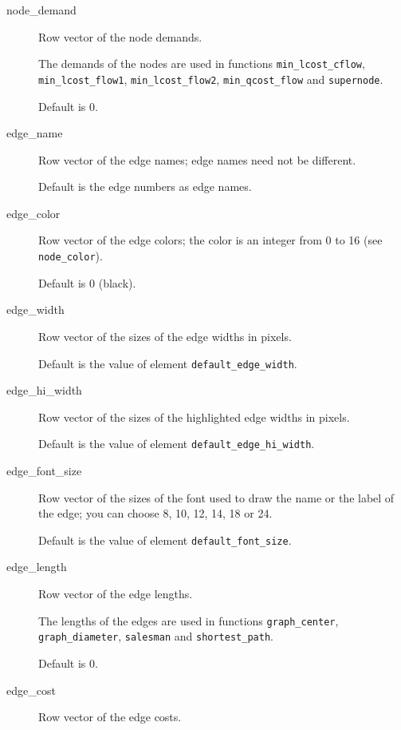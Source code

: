 \documentclass[11pt]{article}
\newcommand{\func}[1]{\texttt{#1}}
\begin{document}
\begin{description}
  \item[node\_demand]

Row vector of the node demands.

The demands of the nodes are used in functions
\func{min\_lcost\_cflow}, 
\func{min\_lcost\_flow1}, \func{min\_lcost\_flow2},
\func{min\_qcost\_flow} and
\func{supernode}.

Default is 0.

  \item[edge\_name]

Row vector of the edge names; edge names need not be different.

Default is the edge numbers as edge names.

  \item[edge\_color]

Row vector of the edge colors; 
the color is an integer from 0 to 16 (see \texttt{node\_color}).

Default is 0 (black).

  \item[edge\_width]

Row vector of the sizes of the edge widths in pixels.

Default is the value of element \texttt{default\_edge\_width}.

  \item[edge\_hi\_width]

Row vector of the sizes of the highlighted edge widths in pixels.

Default is the value of element \texttt{default\_edge\_hi\_width}.

  \item[edge\_font\_size]

Row vector of the sizes of the font used to draw the name or the label of
the edge; you 
can choose 8, 10, 12, 14, 18 or 24.

Default is the value of element \texttt{default\_font\_size}.

  \item[edge\_length]

Row vector of the edge lengths.

The lengths of the edges are used in functions \func{graph\_center}, 
\func{graph\_diameter},
\func{salesman} and \func{shortest\_path}.

Default is 0.

  \item[edge\_cost]

Row vector of the edge costs.


\end{description}
\end{document}

